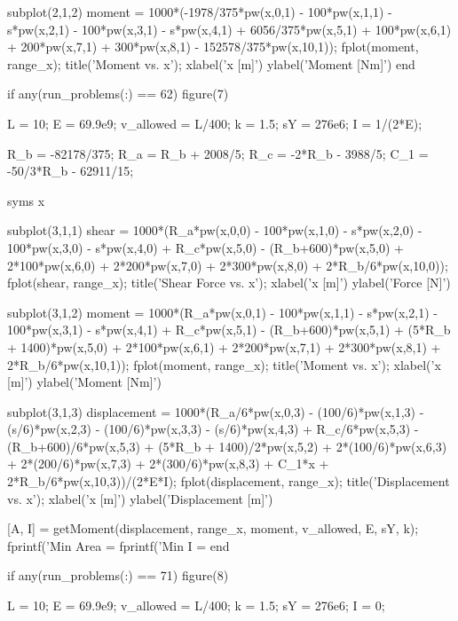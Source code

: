 \documentclass[a4paper]{article}
\begin{document}
\begin{verbatim*}
    subplot(2,1,2)
    moment = 1000*(-1978/375*pw(x,0,1) - 100*pw(x,1,1) - s*pw(x,2,1) - 100*pw(x,3,1) - s*pw(x,4,1) + 6056/375*pw(x,5,1) + 100*pw(x,6,1) + 200*pw(x,7,1) + 300*pw(x,8,1) - 152578/375*pw(x,10,1));
    fplot(moment, range_x);
    title('Moment vs. x');
    xlabel('x [m]')
    ylabel('Moment [Nm]')
end

if any(run_problems(:) == 62)
    figure(7)

    L = 10; %
    E = 69.9e9; %
    v_allowed = L/400; %
    k = 1.5; %
    sY = 276e6; %
    I = 1/(2*E);

    R_b = -82178/375;
    R_a = R_b + 2008/5;
    R_c = -2*R_b - 3988/5;
    C_1 = -50/3*R_b - 62911/15;


    syms x

    subplot(3,1,1)
    shear = 1000*(R_a*pw(x,0,0) - 100*pw(x,1,0) - s*pw(x,2,0) - 100*pw(x,3,0) - s*pw(x,4,0) + R_c*pw(x,5,0) - (R_b+600)*pw(x,5,0) + 2*100*pw(x,6,0) + 2*200*pw(x,7,0) + 2*300*pw(x,8,0) + 2*R_b/6*pw(x,10,0));
    fplot(shear, range_x);
    title('Shear Force vs. x');
    xlabel('x [m]')
    ylabel('Force [N]')

    subplot(3,1,2)
    moment = 1000*(R_a*pw(x,0,1) - 100*pw(x,1,1) - s*pw(x,2,1) - 100*pw(x,3,1) - s*pw(x,4,1) + R_c*pw(x,5,1) - (R_b+600)*pw(x,5,1) + (5*R_b + 1400)*pw(x,5,0) + 2*100*pw(x,6,1) + 2*200*pw(x,7,1) + 2*300*pw(x,8,1) + 2*R_b/6*pw(x,10,1));
    fplot(moment, range_x);
    title('Moment vs. x');
    xlabel('x [m]')
    ylabel('Moment [Nm]')
    
    subplot(3,1,3)
    displacement = 1000*(R_a/6*pw(x,0,3) - (100/6)*pw(x,1,3) - (s/6)*pw(x,2,3) - (100/6)*pw(x,3,3) - (s/6)*pw(x,4,3) + R_c/6*pw(x,5,3) - (R_b+600)/6*pw(x,5,3) + (5*R_b + 1400)/2*pw(x,5,2) + 2*(100/6)*pw(x,6,3) + 2*(200/6)*pw(x,7,3) + 2*(300/6)*pw(x,8,3) + C_1*x + 2*R_b/6*pw(x,10,3))/(2*E*I);
    fplot(displacement, range_x);
    title('Displacement vs. x');
    xlabel('x [m]')
    ylabel('Displacement [m]')

    [A, I] = getMoment(displacement, range_x, moment, v_allowed, E, sY, k);
    fprintf('Min Area = %
    fprintf('Min I = %
end


if any(run_problems(:) == 71)
    figure(8)

    L = 10; %
    E = 69.9e9; %
    v_allowed = L/400; %
    k = 1.5; %
    sY = 276e6; %
    I = 0; %


\end{verbatim*}
\end{document}
